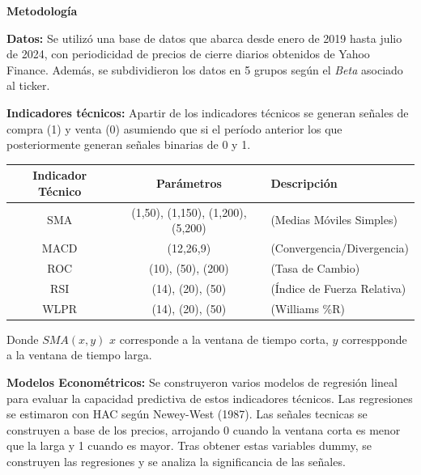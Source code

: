 \documentclass[a0,portrait]{a0poster}
\newcommand{\customsection}[1]{
    \begin{center}
        \begin{tcolorbox}[colframe=miRojo!50, colback=miRojo, width=\linewidth, boxrule=1mm, arc=3mm, auto outer arc]
            \centering
            \vspace{.5cm} %
            \color{white}
            \textbf{\Huge #1}
            \color{miRojo}
            \vspace{.5cm} %
        \end{tcolorbox}
    \end{center}
}
\begin{document}
\begin{multicols}{2}
\begin{minipage}{,984\linewidth}
\begin{tabular}{cc}
        \end{tabular}
        \end{minipage}
    \customsection{Metodología}
    \par
    \textbf{Datos:} Se utilizó una base de datos que abarca desde enero de 2019 hasta julio de 2024, con periodicidad de precios
     de cierre diarios obtenidos de Yahoo Finance. Además, se subdividieron los datos en 5 grupos según el \textit{Beta} asociado al ticker.  
    \par
    \textbf{Indicadores técnicos:} Apartir de los indicadores técnicos se generan señales de compra (1) y venta (0) asumiendo que si el período anterior
     los que posteriormente generan señales binarias de 0 y 1.\\
     \begin{minipage}{,984\linewidth}
        \centering
        \vspace{1cm}
        \begin{tabular}{ccl}
            \toprule
            \textbf{Indicador Técnico} & \textbf{Parámetros} & \textbf{Descripción}\\
            \midrule
             SMA & (1,50), (1,150), (1,200), (5,200)  & (Medias Móviles Simples)\\
             MACD & (12,26,9) & (Convergencia/Divergencia) \\
             ROC & (10), (50), (200) & (Tasa de Cambio) \\
             RSI & (14), (20), (50) & (Índice de Fuerza Relativa) \\
             WLPR & (14), (20), (50) &  (Williams \%R)\\
            \bottomrule
        \end{tabular}
        \captionsetup{width=0.8\textwidth}  %
        \caption*{\footnotesize Donde $SMA(x,y)$ $x$ corresponde a la ventana de tiempo corta, $y$ correspponde a la ventana de tiempo larga.}
        \end{minipage}
    \par
    \textbf{Modelos Econométricos:} Se construyeron varios modelos de regresión lineal para evaluar la capacidad predictiva de 
    estos indicadores técnicos. Las regresiones se estimaron con HAC según Newey-West (1987). Las señales tecnicas se construyen 
    a base de los precios, arrojando 0 cuando la ventana corta es menor que la larga y 1 cuando es mayor. Tras obtener estas 
    variables dummy, se construyen las regresiones y se analiza la significancia de 
    las señales. 
    

\end{multicols}
\end{document}
